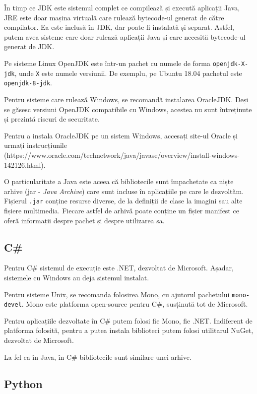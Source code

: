 În timp ce JDK este sistemul complet ce compilează și execută aplicații Java,
JRE este doar mașina virtuală care rulează bytecode-ul generat de către
compilator. Ea este inclusă în JDK, dar poate fi instalată și separat. Astfel,
putem avea sisteme care doar rulează aplicații Java și care necesită bytecode-ul
generat de JDK.

Pe sisteme Linux OpenJDK este într-un pachet cu numele de forma \texttt{openjdk-X-jdk}, unde \texttt{X} este numele versiunii. De exemplu, pe Ubuntu 18.04 pachetul este \texttt{openjdk-8-jdk}.

Pentru sisteme care rulează Windows, se recomandă instalarea OracleJDK. Deși se
găsesc versiuni OpenJDK compatibile cu Windows, acestea nu sunt întreținute și
prezintă riscuri de securitate.

Pentru a instala OracleJDK pe un sistem Windows, accesați site-ul Oracle și
urmați instrucțiunile
(https://www.oracle.com/technetwork/java/javase/overview/install-windows-142126.html).

O particularitate a Java este aceea că bibliotecile sunt împachetate ca niște
arhive (jar - \textit{Java Archive}) care sunt incluse în aplicațiile pe care le
dezvoltăm. Fișierul \texttt{.jar} conține resurse diverse, de la definiții de clase la
imagini sau alte fișiere multimedia. Fiecare astfel de arhivă poate conține un
fișier manifest ce oferă informații despre pachet și despre utilizarea sa.

\subsection{C\#}
\label{sec:appdev:dev-env:csharp}

Pentru C\# sistemul de execuție este .NET, dezvoltat de Microsoft. Așadar,
sistemele cu Windows au deja sistemul instalat.

Pentru sisteme Unix, se recomanda folosirea Mono, cu ajutorul pachetului \texttt{mono-devel}. Mono este platforma
open-source pentru C\#, susținută tot de Microsoft.

Pentru aplicațiile dezvoltate în C\# putem folosi fie Mono, fie .NET. Indiferent
de platforma folosită, pentru a putea instala biblioteci putem folosi utilitarul
NuGet, dezvoltat de Microsoft.

La fel ca în Java, în C\# bibliotecile sunt similare unei arhive.

\subsection{Python}
\label{sec:appdev:dev-env:python}

